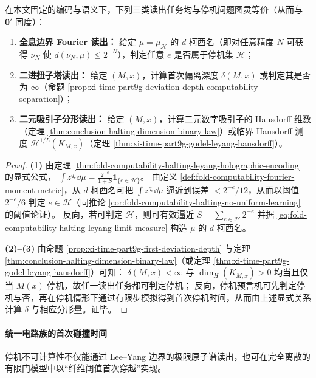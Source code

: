 \begin{corollary}\label{cor:fold-computability-holography-torsion-fractal-halting-equivalent}
在本文固定的编码与语义下，下列三类读出任务均与停机问题图灵等价（从而与 \(\mathbf 0'\) 同度）：
\begin{enumerate}
\normalfont
  \item \textbf{全息边界 Fourier 读出：}
  给定 \(\mu=\mu_{\mathcal H}\) 的 \(d\)-柯西名（即对任意精度 \(N\) 可获得 \(\nu_N\) 使 \(d(\nu_N,\mu)\le 2^{-N}\)），判定任意 \(e\) 是否属于停机集 \(\mathcal H\)；
  \item \textbf{二进扭子塔读出：}
  给定 \((M,x)\)，计算首次偏离深度 \(\delta(M,x)\) 或判定其是否为 \(\infty\)（命题 \ref{prop:xi-time-part9g-deviation-depth-computability-separation}）；
  \item \textbf{二元吸引子分形读出：}
  给定 \((M,x)\)，计算二元数字吸引子的 Hausdorff 维数（定理 \ref{thm:conclusion-halting-dimension-binary-law}）或临界 Hausdorff 测度 \(\mathcal H^{1/L}(K_{M,x})\)（定理 \ref{thm:xi-time-part9g-godel-leyang-hausdorff}）。
\end{enumerate}
\end{corollary}
\begin{proof}
\textbf{(1)} 由定理 \ref{thm:fold-computability-halting-leyang-holographic-encoding} 的显式公式，
\(
\int z^{q_e}\dd\mu=\frac{2^{-e}}{1+S}\mathbf 1_{\{e\in\mathcal H\}}
\)。
由定义 \ref{def:fold-computability-fourier-moment-metric}，从 \(d\)-柯西名可把 \(\int z^{q_e}\dd\mu\) 逼近到误差 \(<2^{-e}/12\)，从而以阈值 \(2^{-e}/6\) 判定 \(e\in\mathcal H\)（同推论 \ref{cor:fold-computability-halting-no-uniform-learning} 的阈值论证）。
反向，若可判定 \(\mathcal H\)，则可有效逼近 \(S=\sum_{e\in\mathcal H}2^{-e}\) 并据 \eqref{eq:fold-computability-halting-leyang-limit-measure} 构造 \(\mu\) 的 \(d\)-柯西名。
\par
\textbf{(2)--(3)} 由命题 \ref{prop:xi-time-part9g-first-deviation-depth} 与定理 \ref{thm:conclusion-halting-dimension-binary-law}（或定理 \ref{thm:xi-time-part9g-godel-leyang-hausdorff}）可知：
\(\delta(M,x)<\infty\) 与 \(\dim_H(K_{M,x})>0\) 均当且仅当 \(M(x)\) 停机，故任一读出任务都可判定停机；
反向，停机预言机可先判定停机与否，再在停机情形下通过有限步模拟得到首次停机时间，从而由上述显式关系计算 \(\delta\) 与相应分形量。证毕。
\end{proof}

\paragraph{统一电路族的首次碰撞时间}
停机不可计算性不仅能通过 Lee--Yang 边界的极限原子谱读出，也可在完全离散的有限门模型中以“纤维阈值首次穿越”实现。

